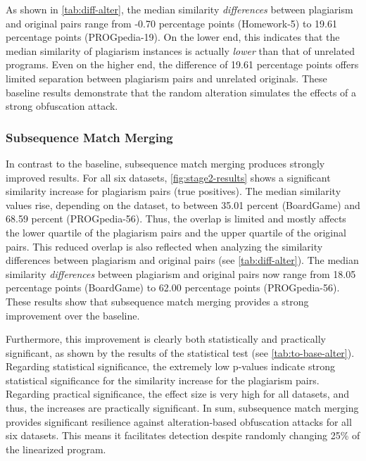 As shown in \autoref{tab:diff-alter}, the median similarity \textit{differences} between plagiarism and original pairs range from -0.70 percentage points (Homework-5) to 19.61 percentage points (PROGpedia-19). On the lower end, this indicates that the median similarity of plagiarism instances is actually \textit{lower} than that of unrelated programs. Even on the higher end, the difference of 19.61 percentage points offers limited separation between plagiarism pairs and unrelated originals. These baseline results demonstrate that the random alteration simulates the effects of a strong obfuscation attack.

\subsubsection{Subsequence Match Merging}
In contrast to the baseline, subsequence match merging produces strongly improved results.
For all six datasets, \autoref{fig:stage2-results} shows a significant similarity increase for plagiarism pairs (true positives).
The median similarity values rise, depending on the dataset, to between 35.01 percent (BoardGame) and 68.59 percent (PROGpedia-56).
Thus, the overlap is limited and mostly affects the lower quartile of the plagiarism pairs and the upper quartile of the original pairs.
This reduced overlap is also reflected when analyzing the similarity differences between plagiarism and original pairs (see \autoref{tab:diff-alter}).
The median similarity \textit{differences} between plagiarism and original pairs now range from 18.05 percentage points (BoardGame) to 62.00 percentage points (PROGpedia-56).
These results show that subsequence match merging provides a strong improvement over the baseline.

Furthermore, this improvement is clearly both statistically and practically significant, as shown by the results of the statistical test (see \autoref{tab:to-base-alter}).
Regarding statistical significance, the extremely low p-values indicate strong statistical significance for the similarity increase for the plagiarism pairs.
Regarding practical significance, the effect size is very high for all datasets, and thus, the increases are practically significant.
In sum, subsequence match merging provides significant resilience against alteration-based obfuscation attacks for all six datasets.
This means it facilitates detection despite randomly changing 25\% of the linearized program.



